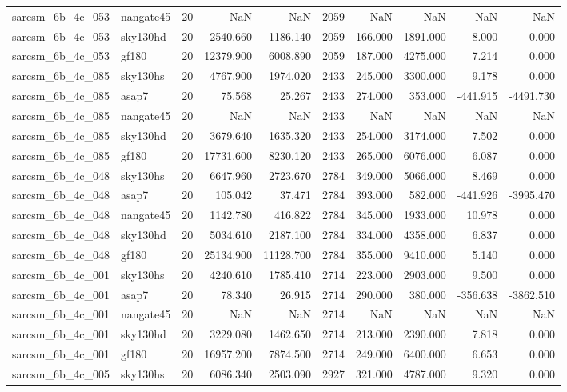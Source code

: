 \documentclass{article}
\begin{document}
\begin{longtable}{llrrrrrrrr}
sarcsm\_6b\_4c\_053 & nangate45 & 20 & NaN & NaN & 2059 & NaN & NaN & NaN & NaN \\
sarcsm\_6b\_4c\_053 & sky130hd & 20 & 2540.660 & 1186.140 & 2059 & 166.000 & 1891.000 & 8.000 & 0.000 \\
sarcsm\_6b\_4c\_053 & gf180 & 20 & 12379.900 & 6008.890 & 2059 & 187.000 & 4275.000 & 7.214 & 0.000 \\
sarcsm\_6b\_4c\_085 & sky130hs & 20 & 4767.900 & 1974.020 & 2433 & 245.000 & 3300.000 & 9.178 & 0.000 \\
sarcsm\_6b\_4c\_085 & asap7 & 20 & 75.568 & 25.267 & 2433 & 274.000 & 353.000 & -441.915 & -4491.730 \\
sarcsm\_6b\_4c\_085 & nangate45 & 20 & NaN & NaN & 2433 & NaN & NaN & NaN & NaN \\
sarcsm\_6b\_4c\_085 & sky130hd & 20 & 3679.640 & 1635.320 & 2433 & 254.000 & 3174.000 & 7.502 & 0.000 \\
sarcsm\_6b\_4c\_085 & gf180 & 20 & 17731.600 & 8230.120 & 2433 & 265.000 & 6076.000 & 6.087 & 0.000 \\
sarcsm\_6b\_4c\_048 & sky130hs & 20 & 6647.960 & 2723.670 & 2784 & 349.000 & 5066.000 & 8.469 & 0.000 \\
sarcsm\_6b\_4c\_048 & asap7 & 20 & 105.042 & 37.471 & 2784 & 393.000 & 582.000 & -441.926 & -3995.470 \\
sarcsm\_6b\_4c\_048 & nangate45 & 20 & 1142.780 & 416.822 & 2784 & 345.000 & 1933.000 & 10.978 & 0.000 \\
sarcsm\_6b\_4c\_048 & sky130hd & 20 & 5034.610 & 2187.100 & 2784 & 334.000 & 4358.000 & 6.837 & 0.000 \\
sarcsm\_6b\_4c\_048 & gf180 & 20 & 25134.900 & 11128.700 & 2784 & 355.000 & 9410.000 & 5.140 & 0.000 \\
sarcsm\_6b\_4c\_001 & sky130hs & 20 & 4240.610 & 1785.410 & 2714 & 223.000 & 2903.000 & 9.500 & 0.000 \\
sarcsm\_6b\_4c\_001 & asap7 & 20 & 78.340 & 26.915 & 2714 & 290.000 & 380.000 & -356.638 & -3862.510 \\
sarcsm\_6b\_4c\_001 & nangate45 & 20 & NaN & NaN & 2714 & NaN & NaN & NaN & NaN \\
sarcsm\_6b\_4c\_001 & sky130hd & 20 & 3229.080 & 1462.650 & 2714 & 213.000 & 2390.000 & 7.818 & 0.000 \\
sarcsm\_6b\_4c\_001 & gf180 & 20 & 16957.200 & 7874.500 & 2714 & 249.000 & 6400.000 & 6.653 & 0.000 \\
sarcsm\_6b\_4c\_005 & sky130hs & 20 & 6086.340 & 2503.090 & 2927 & 321.000 & 4787.000 & 9.320 & 0.000 \\

\end{longtable}
\end{document}
